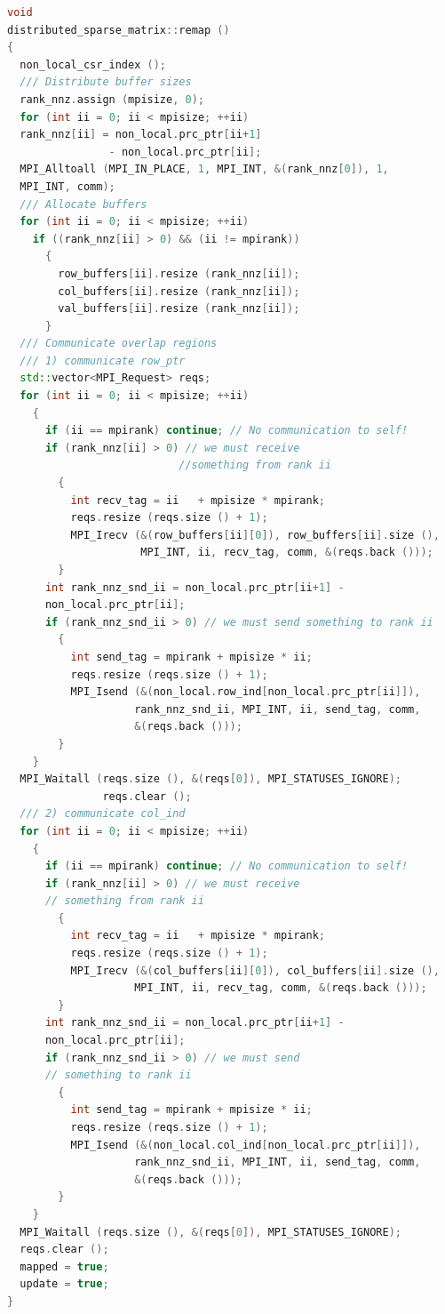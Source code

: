 \begin{lstlisting}[language=C++, caption={distributed\_sparse\_matrix::remap ()}]
void
distributed_sparse_matrix::remap ()
{
  non_local_csr_index ();
  /// Distribute buffer sizes
  rank_nnz.assign (mpisize, 0);
  for (int ii = 0; ii < mpisize; ++ii)
  rank_nnz[ii] = non_local.prc_ptr[ii+1] 
                - non_local.prc_ptr[ii];
  MPI_Alltoall (MPI_IN_PLACE, 1, MPI_INT, &(rank_nnz[0]), 1,
  MPI_INT, comm);
  /// Allocate buffers
  for (int ii = 0; ii < mpisize; ++ii)
    if ((rank_nnz[ii] > 0) && (ii != mpirank))
	  {
		row_buffers[ii].resize (rank_nnz[ii]);
		col_buffers[ii].resize (rank_nnz[ii]);
		val_buffers[ii].resize (rank_nnz[ii]);
	  }
  /// Communicate overlap regions
  /// 1) communicate row_ptr
  std::vector<MPI_Request> reqs;
  for (int ii = 0; ii < mpisize; ++ii)
	{
	  if (ii == mpirank) continue; // No communication to self!
      if (rank_nnz[ii] > 0) // we must receive 
                           //something from rank ii
        {
		  int recv_tag = ii   + mpisize * mpirank;
          reqs.resize (reqs.size () + 1);
		  MPI_Irecv (&(row_buffers[ii][0]), row_buffers[ii].size (),
                     MPI_INT, ii, recv_tag, comm, &(reqs.back ()));
        }
      int rank_nnz_snd_ii = non_local.prc_ptr[ii+1] -
      non_local.prc_ptr[ii];
      if (rank_nnz_snd_ii > 0) // we must send something to rank ii
        {
		  int send_tag = mpirank + mpisize * ii;
          reqs.resize (reqs.size () + 1);
		  MPI_Isend (&(non_local.row_ind[non_local.prc_ptr[ii]]),
					rank_nnz_snd_ii, MPI_INT, ii, send_tag, comm,
					&(reqs.back ()));
		}     
	}
  MPI_Waitall (reqs.size (), &(reqs[0]), MPI_STATUSES_IGNORE);
               reqs.clear ();
  /// 2) communicate col_ind
  for (int ii = 0; ii < mpisize; ++ii)
    {
	  if (ii == mpirank) continue; // No communication to self!
	  if (rank_nnz[ii] > 0) // we must receive 
      // something from rank ii
        {
		  int recv_tag = ii   + mpisize * mpirank;
		  reqs.resize (reqs.size () + 1);
		  MPI_Irecv (&(col_buffers[ii][0]), col_buffers[ii].size (),
					MPI_INT, ii, recv_tag, comm, &(reqs.back ()));
		}
      int rank_nnz_snd_ii = non_local.prc_ptr[ii+1] -
      non_local.prc_ptr[ii];
	  if (rank_nnz_snd_ii > 0) // we must send 
	  // something to rank ii
	    {
		  int send_tag = mpirank + mpisize * ii;
          reqs.resize (reqs.size () + 1);
		  MPI_Isend (&(non_local.col_ind[non_local.prc_ptr[ii]]),
					rank_nnz_snd_ii, MPI_INT, ii, send_tag, comm,
					&(reqs.back ()));
        }     
	}
  MPI_Waitall (reqs.size (), &(reqs[0]), MPI_STATUSES_IGNORE);
  reqs.clear ();
  mapped = true;
  update = true;
}
\end{lstlisting}
